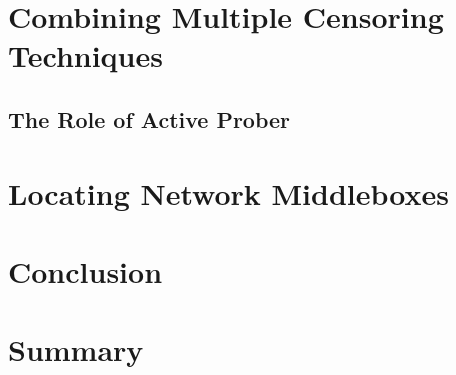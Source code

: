 \section{Combining Multiple Censoring Techniques}

\subsection{The Role of Active Prober}

\section{Locating Network Middleboxes}

\section{Conclusion}

\section{Summary}